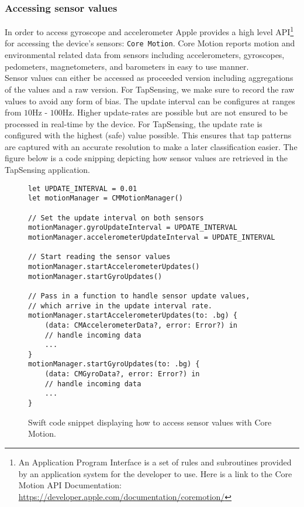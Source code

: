 \subsubsection{Accessing sensor values}
In order to access gyroscope and accelerometer Apple provides a high level API\footnote{An Application Program Interface is a set of rules and subroutines provided by an application system for the developer to use. Here is a link to the Core Motion API Documentation: \url{https://developer.apple.com/documentation/coremotion/} } for accessing the device's sensors: \texttt{Core Motion}. Core Motion reports motion and environmental related data from sensors including accelerometers, gyroscopes, pedometers, magnetometers, and barometers in easy to use manner. \\

Sensor values can either be accessed as proceeded version including aggregations of the values and a raw version. For TapSensing, we make sure to record the raw values to avoid any form of bias. The update interval can be configures at ranges from $10$Hz - $100$Hz. Higher update-rates are possible but are not ensured to be processed in real-time by the device. For TapSensing, the update rate is configured with the highest (safe) value possible. This ensures that tap patterns are captured with an accurate resolution to make a later classification easier. The figure below is a code snipping depicting how sensor values are retrieved in the TapSensing application.

\begin{figure}[thp]
\centering
\begin{minipage}{0.7\textwidth}

\begin{verbatim}
let UPDATE_INTERVAL = 0.01
let motionManager = CMMotionManager()

// Set the update interval on both sensors
motionManager.gyroUpdateInterval = UPDATE_INTERVAL
motionManager.accelerometerUpdateInterval = UPDATE_INTERVAL

// Start reading the sensor values
motionManager.startAccelerometerUpdates()
motionManager.startGyroUpdates()

// Pass in a function to handle sensor update values,
// which arrive in the update interval rate.
motionManager.startAccelerometerUpdates(to: .bg) {
    (data: CMAccelerometerData?, error: Error?) in
    // handle incoming data
    ...
}
motionManager.startGyroUpdates(to: .bg) {
    (data: CMGyroData?, error: Error?) in
    // handle incoming data
    ...
}
\end{verbatim}
\end{minipage}
\caption{Swift code snippet displaying how to access sensor values with Core Motion.}
\label{test}
\end{figure}

